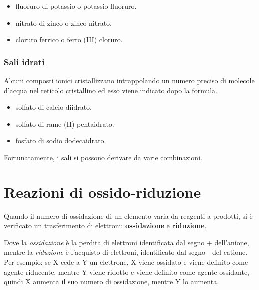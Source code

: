 \begin{itemize}
    \item {} fluoruro di potassio o potassio fluoruro.
    \item {}  nitrato di zinco o zinco nitrato.
    \item {} cloruro ferrico o ferro (III) cloruro.
\end{itemize}  

\subsubsection{Sali idrati}
Alcuni composti ionici cristallizzano intrappolando un numero preciso di molecole d'acqua nel reticolo cristallino ed esso viene indicato dopo la formula. 

\begin{itemize}
    \item {} solfato di calcio diidrato.
    \item {} solfato di rame (II) pentaidrato.
    \item {} fosfato di sodio dodecaidrato. 
\end{itemize}

Fortunatamente, i sali si possono derivare da varie combinazioni.

\section{Reazioni di ossido-riduzione}
Quando il numero di ossidazione di un elemento varia da reagenti a prodotti, si è verificato un trasferimento di elettroni: \textbf{ossidazione} e \textbf{riduzione}. 

Dove la \emph{ossidazione} è la perdita di elettroni identificata dal segno + dell'anione, mentre la \emph{riduzione} è l'acquisto di elettroni, identificato dal segno - del catione.
Per esempio: se X cede a Y un elettrone, X viene ossidato e viene definito come agente riducente, mentre Y viene ridotto e viene definito come agente ossidante, quindi X aumenta il suo numero di ossidazione, mentre Y lo aumenta.